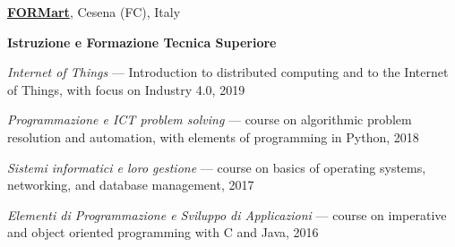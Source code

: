 \href{http://www.formart.it/}{\textbf{FORMart}}, Cesena (FC), Italy
\begin{outerlist}
\item[] \textbf{Istruzione e Formazione Tecnica Superiore}
    \begin{innerlist}
        \item \textit{Internet of Things} --- Introduction to distributed computing and to the Internet of Things, with focus on Industry 4.0, 2019
        \item \textit{Programmazione e ICT problem solving} --- course on algorithmic problem resolution and automation, with elements of programming in Python, 2018
        \item \textit{Sistemi informatici e loro gestione} --- course on basics of operating systems, networking, and database management, 2017
        \item \textit{Elementi di Programmazione e Sviluppo di Applicazioni} --- course on imperative and object oriented programming with C and Java, 2016
    \end{innerlist}
\halfblankline
\end{outerlist}
